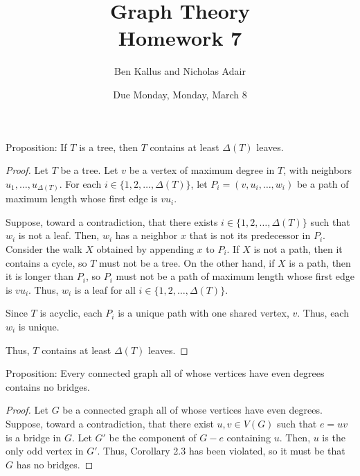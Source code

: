 \documentclass[12pt]{article}
\title{Graph Theory \\ Homework 7}
\author{Ben Kallus and Nicholas Adair}
\date{Due Monday, Monday, March 8}
\begin{document}
\maketitle

 Proposition: If $T$ is a tree, then $T$ contains at least $\Delta(T)$ leaves.
\begin{proof}
    Let $T$ be a tree.
    Let $v$ be a vertex of maximum degree in $T$, with neighbors $u_1, \hdots, u_{\Delta(T)}$.
    For each $i \in \{1,2,\hdots,\Delta(T)\}$, let $P_i = (v, u_i, \hdots, w_i)$ be a path of maximum length whose first edge is $vu_i$.

    Suppose, toward a contradiction, that there exists $i \in \{1,2,\hdots,\Delta(T)\}$ such that $w_i$ is not a leaf.
    Then, $w_i$ has a neighbor $x$ that is not its predecessor in $P_i$.
    Consider the walk $X$ obtained by appending $x$ to $P_i$.
    If $X$ is not a path, then it contains a cycle, so $T$ must not be a tree.
    On the other hand, if $X$ is a path, then it is longer than $P_i$, so $P_i$ must not be a path of maximum length whose first edge is $vu_i$.
    Thus, $w_i$ is a leaf for all $i \in \{1,2,\hdots,\Delta(T)\}$.

    Since $T$ is acyclic, each $P_i$ is a unique path with one shared vertex, $v$.
    Thus, each $w_i$ is unique.

    Thus, $T$ contains at least $\Delta(T)$ leaves.
\end{proof}

\newpage{} Proposition: Every connected graph all of whose vertices have even degrees contains no bridges.
\begin{proof}
    Let $G$ be a connected graph all of whose vertices have even degrees.
    Suppose, toward a contradiction, that there exist $u,v \in V(G)$ such that $e=uv$ is a bridge in $G$.
    Let $G'$ be the component of $G-e$ containing $u$.
    Then, $u$ is the only odd vertex in $G'$.
    Thus, Corollary 2.3 has been violated, so it must be that $G$ has no bridges.
\end{proof}
\end{document}
